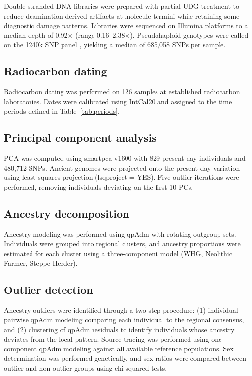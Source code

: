 \documentclass[11pt]{article}
\begin{document}
Double-stranded DNA libraries were prepared with partial UDG treatment \citep{Rohland2015} to reduce deamination-derived artifacts at molecule termini while retaining some diagnostic damage patterns. Libraries were sequenced on Illumina platforms to a median depth of 0.92$\times$ (range 0.16--2.38$\times$). Pseudohaploid genotypes were called on the 1240k SNP panel \citep{Mathieson2015}, yielding a median of 685,058 SNPs per sample.

\subsection{Radiocarbon dating}

Radiocarbon dating was performed on 126 samples at established radiocarbon laboratories. Dates were calibrated using IntCal20 \citep{Reimer2020} and assigned to the time periods defined in Table~\ref{tab:periods}.

\subsection{Principal component analysis}

PCA was computed using smartpca v1600 \citep{Patterson2006} with 829 present-day individuals and 480,712 SNPs. Ancient genomes were projected onto the present-day variation using least-squares projection (lsqproject = YES). Five outlier iterations were performed, removing individuals deviating on the first 10 PCs.

\subsection{Ancestry decomposition}

Ancestry modeling was performed using qpAdm \citep{Haak2015,Patterson2012} with rotating outgroup sets. Individuals were grouped into regional clusters, and ancestry proportions were estimated for each cluster using a three-component model (WHG, Neolithic Farmer, Steppe Herder).

\subsection{Outlier detection}

Ancestry outliers were identified through a two-step procedure: (1) individual pairwise qpAdm modeling comparing each individual to the regional consensus, and (2) clustering of qpAdm residuals to identify individuals whose ancestry deviates from the local pattern. Source tracing was performed using one-component qpAdm modeling against all available reference populations. Sex determination was performed genetically, and sex ratios were compared between outlier and non-outlier groups using chi-squared tests.
\end{document}
